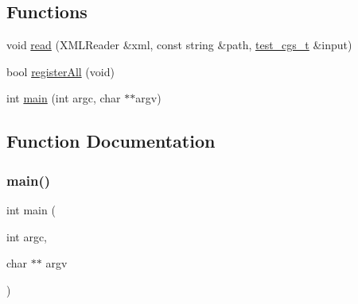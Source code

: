 \subsection*{Functions}
\begin{DoxyCompactItemize}
\item 
void \mbox{\hyperlink{adat-devel_2main_2irreputils_2num__embed__table_8cc_a0bc6eab6ee4938b14f32a0a933d96dd9}{read}} (X\+M\+L\+Reader \&xml, const string \&path, \mbox{\hyperlink{structtest__cgs__t}{test\+\_\+cgs\+\_\+t}} \&input)
\item 
bool \mbox{\hyperlink{adat-devel_2main_2irreputils_2num__embed__table_8cc_a3872416cf70cb24d7da1008a3f3b1d96}{register\+All}} (void)
\item 
int \mbox{\hyperlink{adat-devel_2main_2irreputils_2num__embed__table_8cc_a3c04138a5bfe5d72780bb7e82a18e627}{main}} (int argc, char $\ast$$\ast$argv)
\end{DoxyCompactItemize}


\subsection{Function Documentation}
\mbox{\label{adat-devel_2main_2irreputils_2num__embed__table_8cc_a3c04138a5bfe5d72780bb7e82a18e627}} 
\subsubsection{\texorpdfstring{main()}{main()}}
{\footnotesize\ttfamily int main (\begin{DoxyParamCaption}\item[{int}]{argc,  }\item[{char $\ast$$\ast$}]{argv }\end{DoxyParamCaption})}

